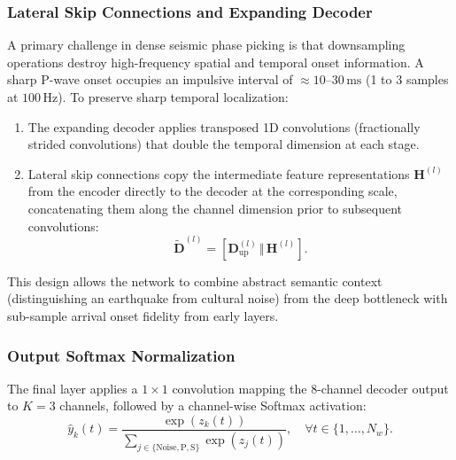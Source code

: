 \subsubsection{Lateral Skip Connections and Expanding Decoder}
A primary challenge in dense seismic phase picking is that downsampling operations destroy high-frequency spatial and temporal onset information. A sharp P-wave onset occupies an impulsive interval of $\approx 10$--$30\,\mathrm{ms}$ (1 to 3 samples at $100\,\mathrm{Hz}$). To preserve sharp temporal localization:
\begin{enumerate}
  \item The expanding decoder applies transposed 1D convolutions (fractionally strided convolutions) that double the temporal dimension at each stage.
  \item Lateral skip connections copy the intermediate feature representations $\mathbf{H}^{(l)}$ from the encoder directly to the decoder at the corresponding scale, concatenating them along the channel dimension prior to subsequent convolutions:
  \begin{equation}
    \tilde{\mathbf{D}}^{(l)} = \left[ \mathbf{D}_{\mathrm{up}}^{(l)} \, \Big\Vert \, \mathbf{H}^{(l)} \right].
  \end{equation}
\end{enumerate}

This design allows the network to combine abstract semantic context (distinguishing an earthquake from cultural noise) from the deep bottleneck with sub-sample arrival onset fidelity from early layers.

\subsubsection{Output Softmax Normalization}
The final layer applies a $1 \times 1$ convolution mapping the 8-channel decoder output to $K=3$ channels, followed by a channel-wise Softmax activation:
\begin{equation}
  \hat{y}_k(t) = \frac{\exp\left(z_k(t)\right)}{\sum_{j \in \{\mathrm{Noise}, \mathrm{P}, \mathrm{S}\}} \exp\left(z_j(t)\right)}, \quad \forall t \in \{1, \dots, N_w\}.
\end{equation}

